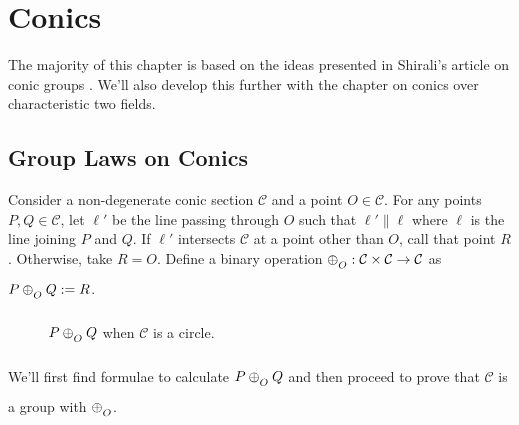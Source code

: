 \chapter{Conics} \label{ch:conics}

The majority of this chapter is based on the ideas presented in Shirali's article
on conic groups \cite{shirali}. We'll also develop this further with the chapter
on conics over characteristic two fields.

\section{Group Laws on Conics}

Consider a non-degenerate conic section $\mathcal{C}$ and a point $O \in
\mathcal{C}$. For any points $P,Q\in\mathcal{C}$, let $\ell'$ be the line passing
through $O$ such that $\ell' \parallel \ell$ where $\ell$ is the line joining $P$
and $Q$. If $\ell'$ intersects $\mathcal{C}$ at a point other than $O$, call that
point $R$. Otherwise, take $R=O$. Define a binary operation
$\conop : \mathcal{C} \times \mathcal{C} \to \mathcal{C}$ as $P \conop Q := R$.
\vspace{1ex}

\begin{figure}[H]
    \center

    \caption{$P \conop Q$ when $\mathcal{C}$ is a circle.}
\end{figure}

We'll first find formulae to calculate $P \conop Q$ and then proceed to prove
that $\mathcal{C}$ is a group with $\conop$.
